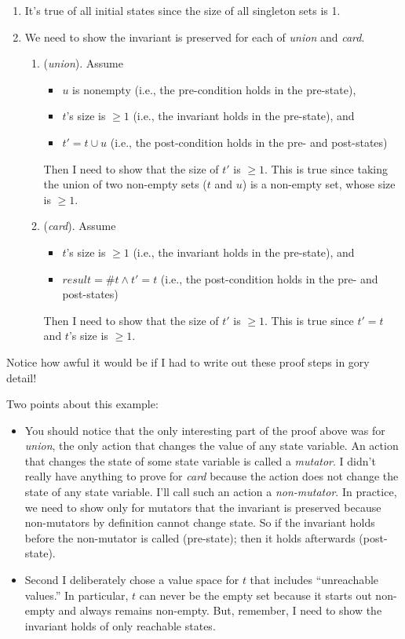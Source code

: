 \begin{enumerate}
\item It's true of all initial states since the size of all singleton sets
is 1.
\item  We need to show the invariant is preserved for each of {\em
union}
and {\em card}.
\begin{enumerate}
\item ({\em union}). Assume
\begin{itemize}
\item $u$ is nonempty (i.e., the pre-condition holds in the pre-state),
\item $t$'s size is $\geq 1$  (i.e., the invariant holds in the pre-state), and
\item $t' = t \cup u$ (i.e., the post-condition holds in the pre- and post-states)
\end{itemize}
Then I need to show that the size of $t'$ is $\geq 1$.  This is true since
taking the union of two non-empty sets ($t$ and $u$) is a non-empty
set,
whose size is $\geq 1$.

\item ({\em card}). Assume
\begin{itemize}
\item $t$'s size is $\geq 1$ (i.e., the invariant holds in the pre-state), and
\item $result = \#t \wedge t' = t$ (i.e., the post-condition holds in the pre- and post-states)
\end{itemize}
Then I need to show that the size of $t'$ is $\geq 1$.  This is true since
$t' = t$ and $t$'s size is $\geq 1$.
\end{enumerate}
\end{enumerate}

\noindent Notice how awful it would be if I had to write out these proof steps
in gory detail!

\vspace{.15in}
Two points about this example:
\begin{itemize}
\item You should notice that
the only interesting part of the proof above was for {\em union},
the only action that changes the value of any state variable.
An action that changes the state of some state variable is called
a {\em mutator}.
I didn't really have anything to prove for {\em card} because
the action does not change the state of any state variable.  I'll call
such an action a {\em non-mutator}.
In practice, we need to show only for mutators that the invariant
is preserved because non-mutators by definition
cannot change state.  So if the invariant holds before the non-mutator
is called (pre-state); then it holds afterwards (post-state).

\item Second I deliberately chose a value space for $t$ that
includes ``unreachable values.''  In particular, $t$ can never
be the empty set because it starts out non-empty and always remains
non-empty.  But, remember, I need to show the invariant
holds of only reachable states.
\end{itemize}

